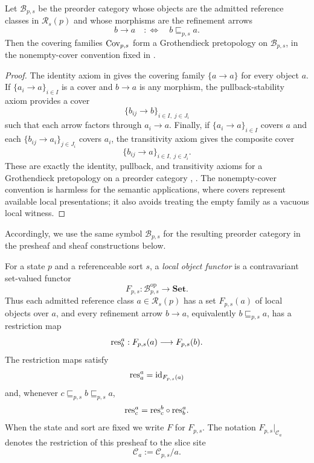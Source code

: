 \begin{proposition}\label{prop:local-reference-pretopology}
Let $\mathcal{B}_{p,s}$ be the preorder category whose objects are the admitted reference classes in $\mathcal{R}_s(p)$ and whose morphisms are the refinement arrows
\[
b\to a
\quad:\Longleftrightarrow\quad
b\sqsubseteq_{p,s} a.
\]
Then the covering families $\mathrm{Cov}_{p,s}$ form a Grothendieck pretopology on $\mathcal{B}_{p,s}$, in the nonempty-cover convention fixed in .
\end{proposition}

\begin{proof}
The identity axiom in  gives the covering family $\{a\to a\}$ for every object $a$. If $\{a_i\to a\}_{i\in I}$ is a cover and $b\to a$ is any morphism, the pullback-stability axiom provides a cover
\[
\{b_{ij}\to b\}_{i\in I,\;j\in J_i}
\]
such that each arrow factors through $a_i\to a$. Finally, if $\{a_i\to a\}_{i\in I}$ covers $a$ and each $\{b_{ij}\to a_i\}_{j\in J_i}$ covers $a_i$, the transitivity axiom gives the composite cover
\[
\{b_{ij}\to a\}_{i\in I,\;j\in J_i}.
\]
These are exactly the identity, pullback, and transitivity axioms for a Grothendieck pretopology on a preorder category \cite[Chap.~III, \S2]{MacLaneMoerdijk1994}, \cite[Part~B2.1]{Johnstone2002}. The nonempty-cover convention is harmless for the semantic applications, where covers represent available local presentations; it also avoids treating the empty family as a vacuous local witness.
\end{proof}

Accordingly, we use the same symbol $\mathcal{B}_{p,s}$ for the resulting preorder category in the presheaf and sheaf constructions below.

\begin{definition}\label{def:local-object-functor}
For a state $p$ and a referenceable sort $s$, a \emph{local object functor} is
a contravariant set-valued functor
\[
F_{p,s}:\mathcal B_{p,s}^{\mathrm{op}}\longrightarrow \mathbf{Set}.
\]
Thus each admitted reference class $a\in\mathcal R_s(p)$ has a set
$F_{p,s}(a)$ of local objects over $a$, and every refinement arrow
$b\to a$, equivalently $b\sqsubseteq_{p,s}a$, has a restriction map
\[
\mathrm{res}_b^a:F_{p,s}(a)\longrightarrow F_{p,s}(b).
\]
The restriction maps satisfy
\[
\mathrm{res}_a^a=\mathrm{id}_{F_{p,s}(a)}
\]
and, whenever $c\sqsubseteq_{p,s} b\sqsubseteq_{p,s}a$,
\[
\mathrm{res}_c^a=\mathrm{res}_c^b\circ \mathrm{res}_b^a.
\]
When the state and sort are fixed we write $F$ for $F_{p,s}$. The notation
$F_{p,s}|_{\mathcal C_a}$ denotes the restriction of this presheaf to the slice
site
\[
\mathcal C_a:=\mathcal C_{p,s}/a.
\]
\end{definition}

